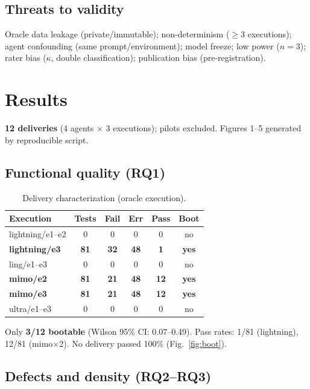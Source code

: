 \documentclass[10pt,twocolumn]{article}
\begin{document}
\subsection{Threats to validity}

Oracle data leakage (private/immutable); non-determinism ($\ge$3 executions); agent confounding (same prompt/environment); model freeze; low power ($n=3$); rater bias ($\kappa$, double classification); publication bias (pre-registration).

\section{Results}

\textbf{12 deliveries} (4 agents $\times$ 3 executions); pilots excluded. Figures 1--5 generated by reproducible script.

\subsection{Functional quality (RQ1)}

\begin{table}[t]
\caption{Delivery characterization (oracle execution).}
\label{tab:delivery}
\small
\begin{tabularx}{\columnwidth}{@{}l c c c c c@{}}
\toprule
\textbf{Execution} & \textbf{Tests} & \textbf{Fail} & \textbf{Err} & \textbf{Pass} & \textbf{Boot}\\
\midrule
lightning/e1--e2 & 0 & 0 & 0 & 0 & no\\
\textbf{lightning/e3} & \textbf{81} & \textbf{32} & \textbf{48} & \textbf{1} & \textbf{yes}\\
ling/e1--e3 & 0 & 0 & 0 & 0 & no\\
\textbf{mimo/e2} & \textbf{81} & \textbf{21} & \textbf{48} & \textbf{12} & \textbf{yes}\\
\textbf{mimo/e3} & \textbf{81} & \textbf{21} & \textbf{48} & \textbf{12} & \textbf{yes}\\
ultra/e1--e3 & 0 & 0 & 0 & 0 & no\\
\bottomrule
\end{tabularx}
\end{table}

Only \textbf{3/12 bootable} (Wilson 95\% CI: 0.07--0.49). Pass rates: 1/81 (lightning), 12/81 (mimo$\times$2). No delivery passed 100\% (Fig.~\ref{fig:boot}).

\subsection{Defects and density (RQ2--RQ3)}
\end{document}
